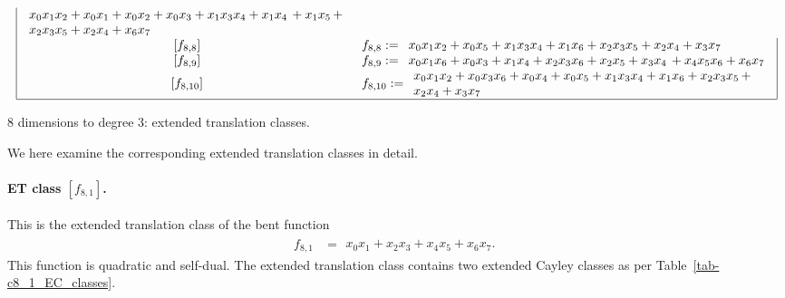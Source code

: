 \documentclass[12pt,a4paper]{article}
\begin{document}
\begin{table}[!bhpt]
\begin{align*}
\begin{array}{|cl|}
\begin{array}{l}
x_{0} x_{1} x_{2} + x_{0} x_{1} + x_{0} x_{2} + x_{0} x_{3} + x_{1} x_{3} x_{4} + x_{1} x_{4}\, +
x_{1} x_{5}\, +
\\
x_{2} x_{3} x_{5} + x_{2} x_{4} + x_{6} x_{7}
\end{array}
\\
\,[f_{ 8 , 8 }] & f_{ 8 , 8 } :=
\begin{array}{l}
x_{0} x_{1} x_{2} + x_{0} x_{5} + x_{1} x_{3} x_{4} + x_{1} x_{6} + x_{2} x_{3} x_{5} + x_{2} x_{4}
+ x_{3} x_{7}
\end{array}
\\
\,[f_{ 8 , 9 }] & f_{ 8 , 9 } :=
\begin{array}{l}
x_{0} x_{1} x_{6} + x_{0} x_{3} + x_{1} x_{4} + x_{2} x_{3} x_{6} + x_{2} x_{5} + x_{3} x_{4}\, +
x_{4} x_{5} x_{6} + x_{6} x_{7}
\end{array}
\\
\,[f_{ 8 , 10 }] & f_{ 8 , 10 } :=
\begin{array}{l}
x_{0} x_{1} x_{2} + x_{0} x_{3} x_{6} + x_{0} x_{4} + x_{0} x_{5} + x_{1} x_{3} x_{4} + x_{1} x_{6}
+ x_{2} x_{3} x_{5}\, +
\\
x_{2} x_{4} + x_{3} x_{7}
\end{array}
\\
\hline
\end{array}
\end{align*}
\normalsize{}
\caption{8 dimensions to degree 3: extended translation classes.}
\label{tab-c8_ET_classes}
\end{table}
We here examine the corresponding extended translation classes in detail.
\paragraph*{ET class $[f_{8,1}]$.}
%
This is the extended translation class of the bent function
\small{}
\begin{align*}
f_{ 8 , 1 } &=
\begin{array}{l}
x_{0} x_{1} + x_{2} x_{3} + x_{4} x_{5} + x_{6} x_{7}.
\end{array}
\end{align*}
\normalsize{}
This function is quadratic and self-dual.
The extended translation class contains two extended Cayley classes as per Table~\ref{tab-c8_1_EC_classes}.
\end{document}
